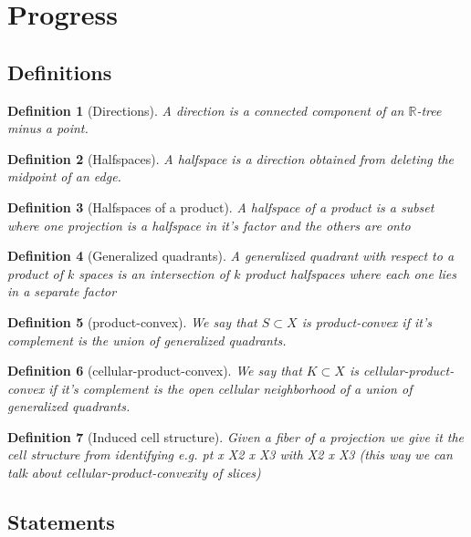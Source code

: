 \documentclass{article}
\theoremstyle{mystyle}
\newtheorem{defn}{Definition}
\theoremstyle{remark}
\begin{document}
\section{Progress}
\subsection{Definitions}

\begin{defn}[Directions] A {\em direction} is a connected component of an \(\mathbb{R}\)-tree minus a point. 
\end{defn}
\begin{defn}[Halfspaces] A halfspace is a direction obtained from deleting the midpoint of an edge.
\end{defn}
\begin{defn}[Halfspaces of a product] A halfspace of a product is a subset where one projection is a halfspace in it's factor and the others are onto
\end{defn}
\begin{defn}[Generalized quadrants] A generalized quadrant with respect to a product of \(k\) spaces is an intersection of \(k\) product halfspaces where each one lies in a separate factor 
\end{defn}
\begin{defn}[product-convex] We say that \(S\subset X\) is product-convex if it's complement is the union of generalized quadrants.
\end{defn}
\begin{defn}[cellular-product-convex] We say that \(K \subset X\) is cellular-product-convex if it's complement is the open cellular neighborhood of a union of generalized quadrants.
\end{defn}
\begin{defn}
    [Induced cell structure]
    Given a fiber of a projection we give it the cell structure from identifying e.g. pt x X2 x X3 with X2 x X3 (this way we can talk about cellular-product-convexity of slices)
\end{defn}
\subsection{Statements}
\end{document}
